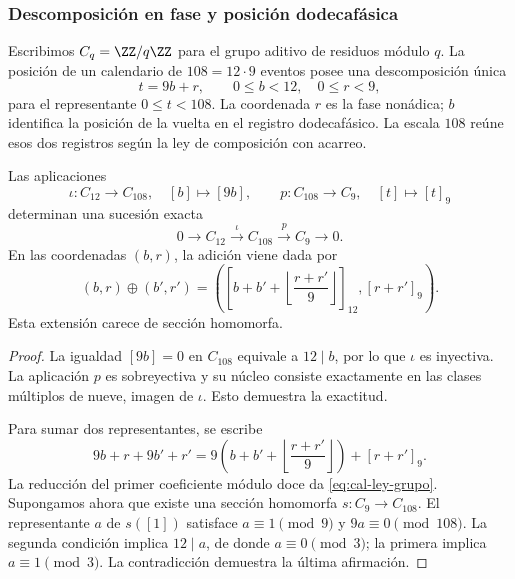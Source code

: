 \subsubsection{Descomposición en fase y posición dodecafásica}

Escribimos $C_q=\ZZ/q\ZZ$ para el grupo aditivo de residuos módulo $q$.
La posición de un calendario de $108=12\cdot9$ eventos posee una
descomposición única
\[
 t=9b+r,\qquad 0\leq b<12,\quad0\leq r<9,
\]
para el representante $0\leq t<108$. La coordenada $r$ es la fase
nonádica; $b$ identifica la posición de la vuelta en el registro
dodecafásico. La escala $108$ reúne esos dos registros según la ley de
composición con acarreo.

\begin{teorema}
\label{thm:cal-extension}
Las aplicaciones
\[
 \iota:C_{12}\longrightarrow C_{108},\quad[b]\longmapsto[9b],
 \qquad p:C_{108}\longrightarrow C_9,\quad[t]\longmapsto[t]_9
\]
determinan una sucesión exacta
\begin{equation}
 0\longrightarrow C_{12}\xrightarrow{\ \iota\ }C_{108}
 \xrightarrow{\ p\ }C_9\longrightarrow0.
 \label{eq:cal-extension}
\end{equation}
En las coordenadas $(b,r)$, la adición viene dada por
\begin{equation}
 (b,r)\oplus(b',r')=
 \left(\left[b+b'+\left\lfloor\frac{r+r'}9\right\rfloor\right]_{12},
 [r+r']_9\right).
 \label{eq:cal-ley-grupo}
\end{equation}
Esta extensión carece de sección homomorfa.
\end{teorema}
\begin{proof}
La igualdad $[9b]=0$ en $C_{108}$ equivale a $12\mid b$, por lo que
$\iota$ es inyectiva. La aplicación $p$ es sobreyectiva y su núcleo
consiste exactamente en las clases múltiplos de nueve, imagen de
$\iota$. Esto demuestra la exactitud.

Para sumar dos representantes, se escribe
\[
 9b+r+9b'+r'
 =9\left(b+b'+\left\lfloor\frac{r+r'}9\right\rfloor\right)
   +[r+r']_9.
\]
La reducción del primer coeficiente módulo doce da
\eqref{eq:cal-ley-grupo}. Supongamos ahora que existe una sección
homomorfa $s:C_9\to C_{108}$. El representante $a$ de $s([1])$
satisface $a\equiv1\pmod9$ y $9a\equiv0\pmod{108}$. La segunda
condición implica $12\mid a$, de donde $a\equiv0\pmod3$; la primera
implica $a\equiv1\pmod3$. La contradicción demuestra la última
afirmación.
\end{proof}

